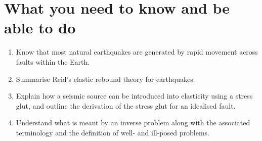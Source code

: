 \section*{What you need to know and be able to do}
\begin{enumerate}
    \item[(i)] Know that most natural earthquakes are generated by rapid movement across faults within the Earth.
    \item[(ii)] Summarise Reid's elastic rebound theory for earthquakes.
    \item[(iii)] Explain how a seismic source can be introduced into elasticity using a stress glut, and outline the derivation of the stress glut for an idealised fault.
    \item[(iv)] Understand what is meant by an inverse problem along with the associated terminology and the definition of well- and ill-posed problems.
\end{enumerate}
